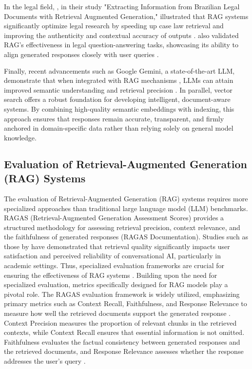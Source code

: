 \begin{refsection}
\hspace{0.4cm}In the legal field, \citeauthor{aquino2024extracting} \citeyear{aquino2024extracting}, in their study "Extracting Information from Brazilian Legal Documents with Retrieval Augmented Generation," illustrated that RAG systems significantly optimize legal research by speeding up case law retrieval and improving the authenticity and contextual accuracy of outputs \cite{aquino2024extracting}.
\newpage
\clearpage
\citeauthor{ryu2023retrieval} \citeyear{ryu2023retrieval} also validated RAG's effectiveness in legal question-answering tasks, showcasing its ability to align generated responses closely with user queries \cite{ryu2023retrieval}.

\hspace{0.4cm}Finally, recent advancements such as Google Gemini, a state-of-the-art LLM, demonstrate that when integrated with RAG mechanisms \citeauthor{prabhulal2025ragpipeline} \citeyear{prabhulal2025ragpipeline}, LLMs can attain improved semantic understanding and retrieval precision \cite{prabhulal2025ragpipeline}. In parallel, vector search offers a robust foundation for developing intelligent, document-aware systems. By combining high-quality semantic embeddings with indexing, this approach ensures that responses remain accurate, transparent, and firmly anchored in domain-specific data rather than relying solely on general model knowledge.


\subsection{Evaluation of Retrieval-Augmented Generation (RAG) Systems}

\hspace{0.4cm}The evaluation of Retrieval-Augmented Generation (RAG) systems requires more specialized approaches than traditional large language model (LLM) benchmarks. RAGAS (Retrieval-Augmented Generation Assessment Scores) provides a structured methodology for assessing retrieval precision, context relevance, and the faithfulness of generated responses (RAGAS Documentation). Studies such as those by \citeauthor{shuster2021retrieval} \citeyear{shuster2021retrieval} have demonstrated that retrieval quality significantly impacts user satisfaction and perceived reliability of conversational AI, particularly in academic settings. Thus, specialized evaluation frameworks are crucial for ensuring the effectiveness of RAG systems \cite{shuster2021retrieval}.
Building upon the need for specialized evaluation, metrics specifically designed for RAG models play a pivotal role. The RAGAS evaluation framework is widely utilized, emphasizing primary metrics such as Context Recall, Faithfulness, and Response Relevance to measure how well the retrieved documents support the generated response \cite{roychowdhury2024evaluation}.
Context Precision measures the proportion of relevant chunks in the retrieved contexts, while Context Recall ensures that essential information is not omitted. Faithfulness evaluates the factual consistency between generated responses and the retrieved documents, and Response Relevance assesses whether the response addresses the user's query \cite{aquino2024extracting} \cite{deepak2025langchain}.


\end{refsection}
